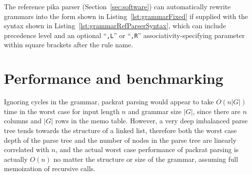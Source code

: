 \documentclass[manuscript,screen]{acmart}
\begin{document}
The reference pika parser (Section~\ref{sec:software}) can automatically rewrite grammars into the form shown in Listing~\ref{lst:grammarFixed} if supplied with the syntax shown in Listing~\ref{lst:grammarRefParserSyntax}, which can include precedence level and an optional ``\texttt{,L}'' or ``\texttt{,R}'' associativity-specifying parameter within square brackets after the rule name.

\section{\label{sec:Performance}Performance and benchmarking}

Ignoring cycles in the grammar, packrat parsing would appear to take $O(n|G|)$ time in the worst case for input length $n$ and grammar size $|G|$, since there are $n$ columns and $|G|$ rows in the memo table. However, a very deep imbalanced parse tree tends towards the structure of a linked list, therefore both the worst case depth of the parse tree and the number of nodes in the parse tree are linearly correlated with $n$, and the actual worst case performance of packrat parsing is actually $O(n)$ no matter the structure or size of the grammar, assuming full memoization of recursive calls.
\end{document}
